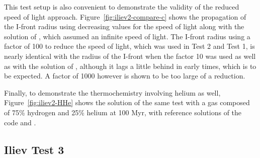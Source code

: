This test setup is also convenient to demonstrate the validity of the reduced speed of light
approach. Figure~\ref{fig:iliev2-compare-c} shows the propagation of the I-front radius using
decreasing values for the speed of light along with the solution of , which assumed
an infinite speed of light. The I-front radius using a factor of 100 to reduce the speed of light,
which was used in Test 2 and Test 1, is nearly identical with the radius of the I-front when the
factor 10 was used as well as with the solution of , although it lags a little
behind in early times, which is to be expected. A factor of 1000 however is shown to be too large
of a reduction.



Finally, to demonstrate the thermochemistry involving helium as well, Figure~\ref{fig:iliev2-HHe}
shows the solution of the same test with a gas composed of 75\% hydrogen and 25\% helium at 100 Myr,
with reference solutions of the  code
\citep{pawlikMultifrequencyThermallyCoupled2011} and 
\citep{chanSmoothedParticleRadiation2021}.












\subsection{Iliev Test 3}\label{chap:Iliev3}


